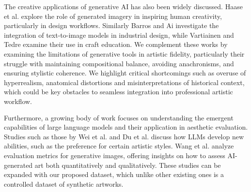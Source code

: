The creative applications of generative AI has also been widely discussed. Haase et al. \cite{inspiring-Haase} explore the role of generated imagery in inspiring human creativity, particularly in design workflows. Similarly Barros and Ai \cite{designing-barros} investigate the integration of text-to-image models in industrial design, while Vartiainen and Tedre \cite{craft-edu} examine their use in craft education. We complement these works by examining the limitations of generative tools in artistic fidelity, particularly their struggle with maintaining compositional balance, avoiding anachronisms, and ensuring stylistic coherence. We highlight critical shortcomings such as overuse of hyperrealism, anatomical distortions and misinterpretations of historical context, which could be key obstacles to seamless integration into professional artistic workflow.  

Furthermore, a growing body of work focuses on understanding the emergent capabilities of large language models and their application in aesthetic evaluation. Studies such as those by Wei et al. \cite{emergent} and Du et al. \cite{loss_perspective} discuss how LLMs develop new abilities, such as the preference for certain artistic styles. Wang et al. \cite{evaluation-metrics} analyze evaluation metrics for generative images, offering insights on how to assess AI-generated art both quantitatively and qualitatively. These studies can be expanded with our proposed dataset, which unlike other existing ones is a controlled dataset of synthetic artworks.